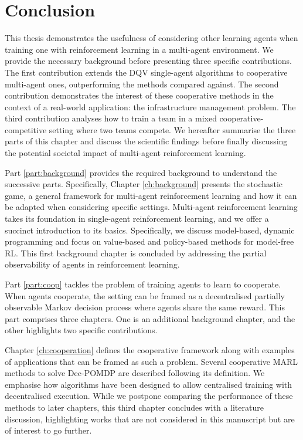 \chapter{Conclusion}\label{ch:conclusion}

This thesis demonstrates the usefulness of considering other learning agents when training one with reinforcement learning in a multi-agent environment.
We provide the necessary background before presenting three specific contributions.
The first contribution extends the DQV single-agent algorithms to cooperative multi-agent ones, outperforming the methods compared against.
The second contribution demonstrates the interest of these cooperative methods in the context of a real-world application: the infrastructure management problem.
The third contribution analyses how to train a team in a mixed cooperative-competitive setting where two teams compete.
We hereafter summarise the three parts of this chapter and discuss the scientific findings before finally discussing the potential societal impact of multi-agent reinforcement learning.

Part \ref{part:background} provides the required background to understand the successive parts.
Specifically, Chapter \ref{ch:background} presents the stochastic game, a general framework for multi-agent reinforcement learning and how it can be adapted when considering specific settings.
Multi-agent reinforcement learning takes its foundation in single-agent reinforcement learning, and we offer a succinct introduction to its basics.
Specifically, we discuss model-based, dynamic programming and focus on value-based and policy-based methods for model-free RL.
This first background chapter is concluded by addressing the partial observability of agents in reinforcement learning.

Part \ref{part:coop} tackles the problem of training agents to learn to cooperate.
When agents cooperate, the setting can be framed as a decentralised partially observable Markov decision process where agents share the same reward.
This part comprises three chapters.
One is an additional background chapter, and the other highlights two specific contributions.

Chapter \ref{ch:cooperation} defines the cooperative framework along with examples of applications that can be framed as such a problem.
Several cooperative MARL methods to solve Dec-POMDP are described following its definition.
We emphasise how algorithms have been designed to allow centralised training with decentralised execution.
While we postpone comparing the performance of these methods to later chapters, this third chapter concludes with a literature discussion, highlighting works that are not considered in this manuscript but are of interest to go further.

